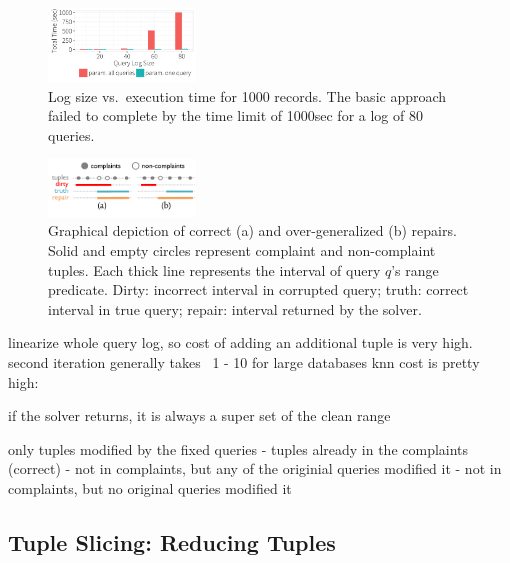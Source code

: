 \begin{figure}[t]
    \centering
    \includegraphics[width=0.35\textwidth]{figures/qsize_time_badscale}
    \vspace*{-0.1in}
    \caption{Log size vs.\ execution time for 1000 records. The basic approach failed to complete by the time limit of 1000sec for a log of $80$ queries.}
    \label{fig:querysize_vs_time}
    \vspace{-2mm}
\end{figure}

\begin{figure}[t]
    \centering
    \includegraphics[width=0.35\textwidth]{figures/2nditerationgroups}
    \vspace*{-2mm}
    \caption{
      Graphical depiction of correct (a) and over-generalized (b) repairs.
      Solid and empty circles represent complaint and non-complaint tuples.
      Each thick line represents the interval of query $q$'s range predicate.
      Dirty: incorrect interval in corrupted query;
      truth: correct interval in true query;
      repair: interval returned by the solver.}
    \label{fig:groups}
    \vspace{-2mm}
\end{figure}



linearize whole query log, so cost of adding an additional tuple is very high.
second iteration generally takes ~1 - 10
for large databases knn cost is pretty high: ~

if the solver returns, it is always a super set of the clean range

only tuples modified by the fixed queries
- tuples already in the complaints (correct)
- not in complaints, but any of the originial queries modified it
- not in complaints, but no original queries modified it
\fi



\subsection{Tuple Slicing: Reducing Tuples}
\label{sec:opt:tbsize}


